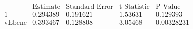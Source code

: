 \[\begin{array}{l|llll}
 \text{} & \text{Estimate} & \text{Standard Error} & \text{t-Statistic} & \text{P-Value} \\
\hline
 1 & 0.294389 & 0.191621 & 1.53631 & 0.129393 \\
 \text{vEbene} & 0.393467 & 0.128808 & 3.05468 & 0.00328231 \\
\end{array}\]

